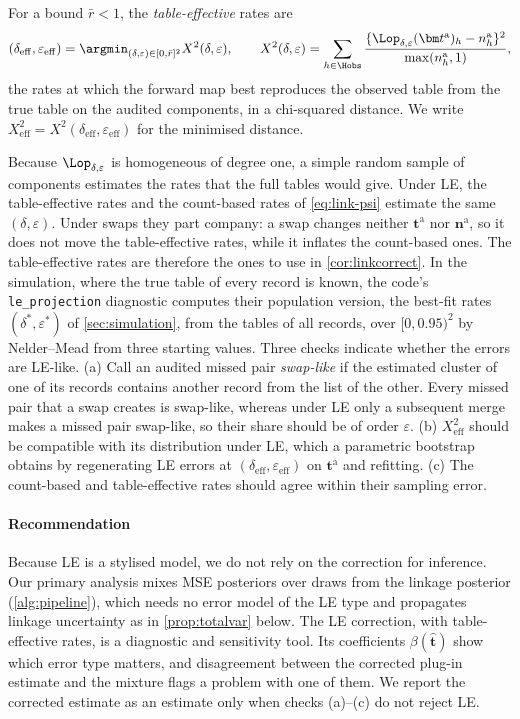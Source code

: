 \begin{definition}\label{def:link-effective}
For a bound $\bar r<1$, the \emph{table-effective} rates are
\[
  (\delta_{\mathrm{eff}},\varepsilon_{\mathrm{eff}})=\argmin_{(\delta,\varepsilon)\in[0,\bar r]^2}X^2(\delta,\varepsilon),\qquad
  X^2(\delta,\varepsilon)=\sum_{h\in\Hobs}\frac{\{\Lop_{\delta,\varepsilon}(\bm t^{\mathrm a})_h-n^{\mathrm a}_h\}^2}{\max(n^{\mathrm a}_h,1)},
\]
the rates at which the forward map best reproduces the observed table from the true table on the audited components, in a chi-squared distance. We write $X^2_{\mathrm{eff}}=X^2(\delta_{\mathrm{eff}},\varepsilon_{\mathrm{eff}})$ for the minimised distance.
\end{definition}

Because $\Lop_{\delta,\varepsilon}$ is homogeneous of degree one, a simple random sample of components estimates the rates that the full tables would give. Under LE, the table-effective rates and the count-based rates of \eqref{eq:link-psi} estimate the same $(\delta,\varepsilon)$. Under swaps they part company: a swap changes neither $\bm t^{\mathrm a}$ nor $\bm n^{\mathrm a}$, so it does not move the table-effective rates, while it inflates the count-based ones. The table-effective rates are therefore the ones to use in \cref{cor:linkcorrect}. In the simulation, where the true table of every record is known, the code's \texttt{le\_projection} diagnostic computes their population version, the best-fit rates $(\delta^\ast,\varepsilon^\ast)$ of \cref{sec:simulation}, from the tables of all records, over $[0,0.95)^2$ by Nelder--Mead from three starting values. Three checks indicate whether the errors are LE-like. (a) Call an audited missed pair \emph{swap-like} if the estimated cluster of one of its records contains another record from the list of the other. Every missed pair that a swap creates is swap-like, whereas under LE only a subsequent merge makes a missed pair swap-like, so their share should be of order $\varepsilon$. (b) $X^2_{\mathrm{eff}}$ should be compatible with its distribution under LE, which a parametric bootstrap obtains by regenerating LE errors at $(\delta_{\mathrm{eff}},\varepsilon_{\mathrm{eff}})$ on $\bm t^{\mathrm a}$ and refitting. (c) The count-based and table-effective rates should agree within their sampling error.

\paragraph{Recommendation}
Because LE is a stylised model, we do not rely on the correction for inference. Our primary analysis mixes MSE posteriors over draws from the linkage posterior (\cref{alg:pipeline}), which needs no error model of the LE type and propagates linkage uncertainty as in \cref{prop:totalvar} below. The LE correction, with table-effective rates, is a diagnostic and sensitivity tool. Its coefficients $\beta(\hat{\bm t})$ show which error type matters, and disagreement between the corrected plug-in estimate and the mixture flags a problem with one of them. We report the corrected estimate as an estimate only when checks (a)--(c) do not reject LE.

